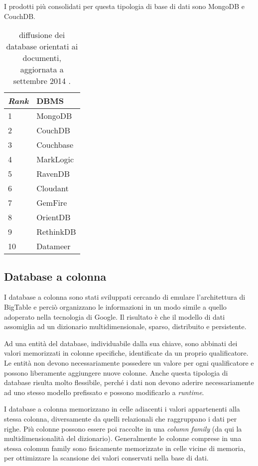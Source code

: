 I prodotti più consolidati per questa tipologia di base di dati sono MongoDB e CouchDB.

\begin{table}[ht]
\centering
\begin{tabular}{|l|l|}
\hline
\textit{Rank} & DBMS      \\ \hline
1             & MongoDB   \\
2             & CouchDB   \\
3             & Couchbase \\
4             & MarkLogic \\
5             & RavenDB   \\
6             & Cloudant  \\
7             & GemFire   \\
8             & OrientDB  \\
9             & RethinkDB \\
10            & Datameer  \\ \hline
\end{tabular}
\caption{diffusione dei database orientati ai documenti, aggiornata a settembre 2014 \cite{URL:dbengines}.}
\end{table}

\subsection{Database a colonna}

I database a colonna sono stati sviluppati cercando di emulare l’architettura di BigTable \cite{google:bigtable} e perciò organizzano le informazioni in un modo simile a quello adoperato nella tecnologia 
di Google. Il risultato è che il modello di dati assomiglia ad un dizionario multidimensionale, sparso, distribuito e persistente.

Ad una entità del database, individuabile dalla sua chiave, sono abbinati dei valori memorizzati in colonne specifiche, identificate da un proprio qualificatore. Le entità non devono 
necessariamente possedere un valore per ogni qualificatore e possono liberamente aggiungere nuove colonne. Anche questa tipologia di database risulta molto flessibile, perché i dati 
non devono aderire necessariamente ad uno stesso modello prefissato e possono modificarlo a \textit{runtime}.

I database a colonna memorizzano in celle adiacenti i valori appartenenti alla stessa colonna, diversamente da quelli relazionali che raggruppano i dati per righe. Più colonne possono 
essere poi raccolte in una \textit{column family} (da qui la multidimensionalità del dizionario). Generalmente le colonne comprese in una stessa colomun family sono fisicamente memorizzate in 
celle vicine di memoria, per ottimizzare la scansione dei valori conservati nella base di dati.

